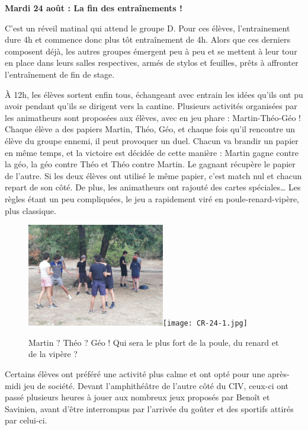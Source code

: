 \begin{center}
{\textbf{Mardi 24 août : La fin des entraînements !}}
\end{center}
\vspace{2mm}

C’est un réveil matinal qui attend le groupe D. Pour ces élèves, l'entrainement dure 4h et commence donc plus tôt entraînement de 4h. Alors que ces derniers composent déjà, les autres groupes émergent peu à peu et se mettent à leur tour en place dans leurs salles respectives, armés de stylos et feuilles, prêts à affronter l’entraînement de fin de stage.

À 12h, les élèves sortent enfin tous, échangeant avec entrain les idées qu’ils ont pu avoir pendant qu’ils se dirigent vers la cantine. Plusieurs activités organisées par les animatheurs sont proposées aux élèves, avec en jeu phare : Martin-Théo-Géo ! Chaque élève a des papiers Martin, Théo, Géo, et chaque fois qu’il rencontre un élève du groupe ennemi, il peut provoquer un duel. Chacun va brandir un papier en même temps, et la victoire est décidée de cette manière : Martin gagne contre la géo, la géo contre Théo et Théo contre Martin. Le gagnant récupère le papier de l’autre. Si les deux élèves ont utilisé le même papier, c’est match nul et chacun repart de son côté. De plus, les animatheurs ont rajouté des cartes spéciales… Les règles étant un peu compliquées, le jeu a rapidement viré en poule-renard-vipère, plus classique.

\begin{figure}[H]
\centering\includegraphics[width=6cm]{CR-24-0.jpg}\hspace{2cm}\texttt{[image: CR-24-1.jpg]}
\caption{Martin ? Théo ? Géo ! Qui sera le plus fort de la poule, du renard et de la vipère ?}
\end{figure}

Certains élèves ont préféré une activité plus calme et ont opté pour une après-midi jeu de société. Devant l’amphithéâtre de l’autre côté du CIV, ceux-ci ont passé plusieurs heures à jouer aux nombreux jeux proposés par Benoît et Savinien, avant d’être interrompus par l’arrivée du goûter et des sportifs attirés par celui-ci.

